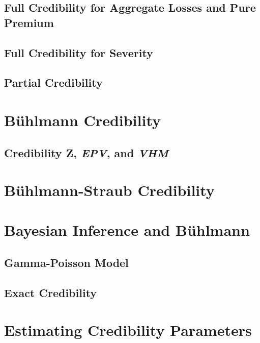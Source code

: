 \documentclass[]{book}
\theoremstyle{definition}
\theoremstyle{definition}
\theoremstyle{definition}
\theoremstyle{remark}
\begin{document}
\subsection{Full Credibility for Aggregate Losses and Pure
Premium}\label{full-credibility-for-aggregate-losses-and-pure-premium}

\subsection{Full Credibility for
Severity}\label{full-credibility-for-severity}

\subsection{Partial Credibility}\label{partial-credibility}

\section{Bühlmann Credibility}\label{buhlmann-credibility}

\subsection{\texorpdfstring{Credibility Z, \emph{EPV}, and
\emph{VHM}}{Credibility Z, EPV, and VHM}}\label{S:EPV-VHM-Z}

\section{Bühlmann-Straub Credibility}\label{buhlmann-straub-credibility}

\section{Bayesian Inference and
Bühlmann}\label{bayesian-inference-and-buhlmann}

\subsection{Gamma-Poisson Model}\label{gamma-poisson-model}

\subsection{Exact Credibility}\label{exact-credibility}

\section{Estimating Credibility
Parameters}\label{estimating-credibility-parameters}
\end{document}
